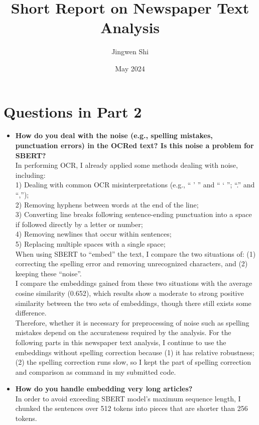 \documentclass{article}
\title{Short Report on Newspaper Text Analysis}
\author{Jingwen Shi}
\date{May 2024}
\begin{document}
\maketitle

\section{Questions in Part 2}
\begin{itemize}
\item \textbf{ How do you deal with the noise (e.g., spelling mistakes, punctuation errors) in the OCRed text? Is this noise a problem for SBERT?}\\
[0.5em]
In performing OCR, I already applied some methods dealing with noise, including:\\
[0.5em]
1) Dealing with common OCR misinterpretations (e.g., “ ' ” and “ ‘ ”; “.” and “,”);\\
2) Removing hyphens between words at the end of the line;\\
3) Converting line breaks following sentence-ending punctuation into a space if followed directly by a letter or number;\\
4) Removing newlines that occur within sentences;\\
5) Replacing multiple spaces with a single space;\\
[1em]
When using SBERT to “embed” the text, I compare the two situations of: (1) correcting the spelling error and removing unrecognized characters, and (2) keeping these “noise”.\\
[0.5em]
I compare the embeddings gained from these two situations with the average cosine similarity (0.652), which results show a moderate to strong positive similarity between the two sets of embeddings, though there still exists some difference.\\
[0.5em]
Therefore, whether it is necessary for preprocessing of noise such as spelling mistakes depend on the accurateness required by the analysis. For the following parts in this newspaper text analysis, I continue to use the embeddings without spelling correction because (1) it has relative robustness; (2) the spelling correction runs slow, so I kept the part of spelling correction and comparison as command in my submitted code.
\item \textbf{ How do you handle embedding very long articles?}\\
[0.5em]
In order to avoid exceeding SBERT model's maximum sequence length, I chunked the sentences over 512 tokens into pieces that are shorter than 256 tokens.\\
[0.5em]
\end{itemize}
\end{document}
